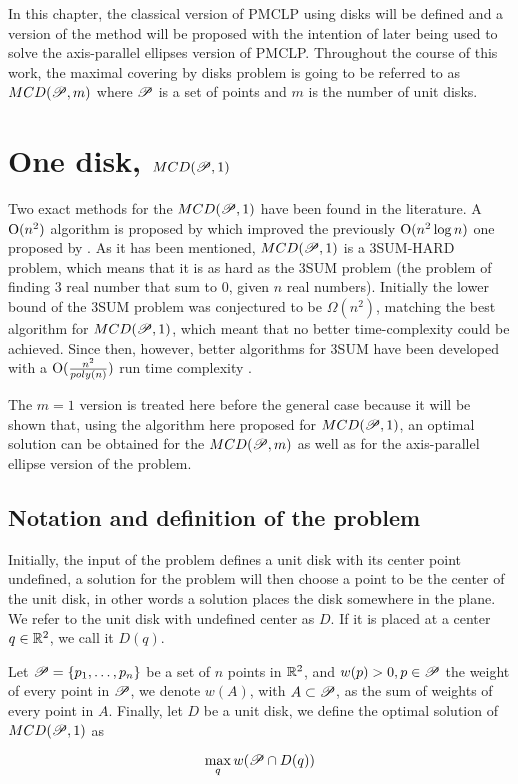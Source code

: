 In this chapter, the classical version of PMCLP using disks will be defined and a version of the method will be proposed with the intention of later being used to solve the axis-parallel ellipses version of PMCLP. Throughout the course of this work, the maximal covering by disks problem is going to be referred to as $MCD(\mathscr{P},m)$ where $\mathscr{P}$ is a set of points and $m$ is the number of unit disks.

\section{One disk, $MCD(\mathscr{P},1)$}


Two exact methods for the $MCD(\mathscr{P}, 1)$ have been found in the literature. A $\mathrm{O}(n^2)$ algorithm is proposed by \cite{chazelle:1986} which improved the previously $\mathrm{O}(n^2\log{n})$ one proposed by \cite{drezner}.
As it has been mentioned, $MCD(\mathscr{P},1)$ is a 3SUM-HARD problem, which means that it is as hard as the 3SUM problem (the problem of finding $3$ real number that sum to $0$, given $n$ real numbers). Initially the lower bound of the 3SUM problem was conjectured to be $\Omega(n^2)$, matching the best algorithm for $MCD(\mathscr{P},1)$, which meant that no better time-complexity could be achieved. Since then, however, better algorithms for 3SUM have been developed with a $\mathrm{O}(\frac{n^2}{poly(n)})$ run time complexity \cite{3SUM-kopelowitz:2014}.

The $m=1$ version is treated here before the general case because it will be shown that, using the algorithm here proposed for $MCD(\mathscr{P}, 1)$, an optimal solution can be obtained for the $MCD(\mathscr{P}, m)$ as well as for the axis-parallel ellipse version of the problem.

\subsection{Notation and definition of the problem}

Initially, the input of the problem defines a unit disk with its center point undefined, a solution for the problem will then choose a point to be the center of the unit disk, in other words a solution places the disk somewhere in the plane.
We refer to the unit disk with undefined center as $D$. If it is placed at a center $q \in \mathbb{R}^2$, we call it $D(q)$.

\begin{definicao}
    Let $\mathscr{P}=\{p_1,\dots,p_n\}$ be a set of $n$ points in $\mathbb{R}^2$, and $w(p)>0, p \in \mathscr{P}$ the weight of every point in $\mathscr{P}$, we denote $w(A)$, with $A \subset \mathscr{P}$, as the sum of weights of every point in $A$. Finally, let $D$ be a unit disk, we define the optimal solution of $MCD(\mathscr{P},1)$ as
    
    \begin{equation}\label{eq:max_one_disk}
        \max_q w(\mathscr{P} \cap D(q))
    \end{equation}

\end{definicao}

